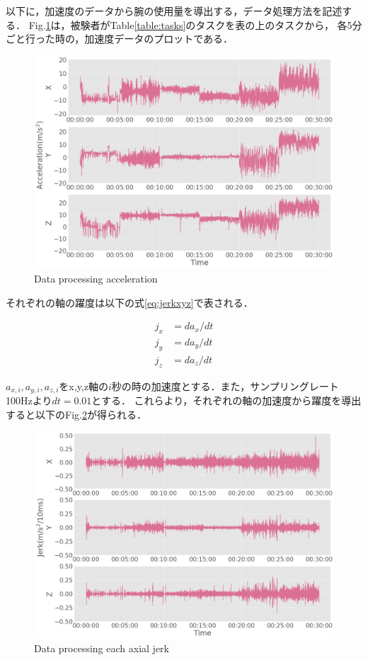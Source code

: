 以下に，加速度のデータから腕の使用量を導出する，データ処理方法を記述する．
Fig.\ref{fig:accel_xyz}は，被験者がTable\ref{table:tasks}のタスクを表の上のタスクから，
各5分ごと行った時の，加速度データのプロットである．

\begin{figure}[H]
  \centering
  \includegraphics[width=0.8\linewidth]{fig/accel_xyz}
  \caption{Data processing acceleration}
  \label{fig:accel_xyz}
\end{figure}


それぞれの軸の躍度は以下の式\ref{eq:jerkxyz}で表される．

\begin{eqnarray}
j_x & = da_x/dt\\
j_y & = da_y/dt\\
j_z & = da_z/dt
\label{eq:jerkxyz}
\end{eqnarray}

$a_{x,i}, a_{y,i},a_{z,i}$をx,y,z軸の$i$秒の時の加速度とする．また，サンプリングレート100Hzより$dt=0.01$とする．
これらより，それぞれの軸の加速度から躍度を導出すると以下のFig.\ref{fig:jerk_xyz}が得られる．

\begin{figure}[H]
  \centering
  \includegraphics[width=0.8\linewidth]{fig/jerk_xyz}
  \caption{Data processing each axial jerk}
  \label{fig:jerk_xyz}
\end{figure}

